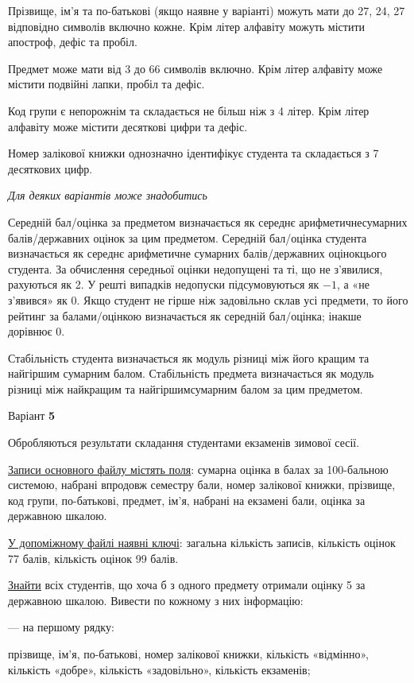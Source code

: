 \documentclass[11pt, ukrainian]{article}
\begin{document}
Прізвище, ім’я та по-батькові (якщо наявне у варіанті) можуть мати до 27, 24, 27 відповідно символів включно кожне. 
Крім літер алфавіту можуть містити апостроф, дефіс та пробіл.

Предмет може мати від 3 до 66 символів включно. 
Крім літер алфавіту може містити подвійні лапки, пробіл та дефіс.

Код групи є непорожнім та складається не більш ніж з 4 літер. 
Крім літер алфавіту може містити десяткові цифри та дефіс.


Номер залікової книжки однозначно ідентифікує студента та складається з 7 десяткових цифр. 

\bigskip\textit{Для деяких варіантів може знадобитись}

Середній бал/оцінка за предметом визначається як середнє арифметичнесумарних балів/державних оцінок за цим предметом. 
Середній бал/оцінка студента визначається як середнє арифметичне сумарних балів/державних оцінокцього студента. 
За обчислення середньої оцінки недопущені та ті, що не з’явилися, рахуються як 2.
У решті випадків недопуски підсумовуються як $-1$, а «не з’явився» як 0.
Якщо студент не гірше ніж задовільно склав усі предмети, 
то його рейтинг за балами/оцінкою визначається як середній бал/оцінка; інакше дорівнює 0.

Стабільність студента визначається як модуль різниці між його кращим та найгіршим сумарним балом.
Стабільність предмета визначається як модуль різниці між найкращим та найгіршимсумарним балом за цим предметом.




\par
\newpage
{\center Варіант  \No \textbf { 5 }\par}
\bigskip
Обробляються результати складання студентами екзаменів зимової сесії.

\underline{Записи основного файлу містять поля}: сумарна оцінка в балах за 100-бальною системою, набрані впродовж семестру бали, номер залікової книжки, прізвище, код групи, по-батькові, предмет, ім’я, набрані на екзамені бали, оцінка за державною шкалою.

\underline{У допоміжному файлі наявні ключі}: загальна кількість записів, кількість оцінок 77 балів, кількість оцінок 99 балів.

\underline{Знайти} всіх студентів, що хоча б з одного предмету отримали оцінку 5 за державною шкалою. Вивести по кожному з них інформацію:\par
{\noindent}--- на першому рядку:\par
прізвище, ім’я, по-батькові, номер залікової книжки, кількість «відмінно», кількість «добре», кількість «задовільно», кількість екзаменів;
\end{document}
